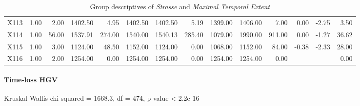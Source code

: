 \begin{table}[ht!]
\begin{tabular}{rrrrrrrrrrrrrr}
    X113 & 1.00 & 2.00 & 1402.50 & 4.95 & 1402.50 & 1402.50 & 5.19 & 1399.00 & 1406.00 & 7.00 & 0.00 & -2.75 & 3.50 \\ 
    X114 & 1.00 & 56.00 & 1537.91 & 274.00 & 1540.00 & 1540.13 & 285.40 & 1079.00 & 1990.00 & 911.00 & 0.00 & -1.27 & 36.62 \\ 
    X115 & 1.00 & 3.00 & 1124.00 & 48.50 & 1152.00 & 1124.00 & 0.00 & 1068.00 & 1152.00 & 84.00 & -0.38 & -2.33 & 28.00 \\ 
    X116 & 1.00 & 2.00 & 1254.00 & 0.00 & 1254.00 & 1254.00 & 0.00 & 1254.00 & 1254.00 & 0.00 &  &  & 0.00 \\ 
     \hline
  \end{tabular}
	\caption{Group descriptives of \textit{Strasse} and \textit{Maximal Temporal Extent}}
	\label{tbl:descriptives_baysis_matched_Strasse_TMax}
\end{table}

\paragraph{Time-loss HGV}
Kruskal-Wallis chi-squared = 1668.3, df = 474, p-value < 2.2e-16

